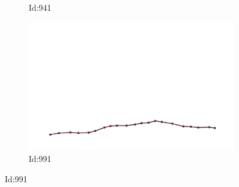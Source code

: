 \documentclass[12pt,twoside]{report}
\begin{document}
\begin{figure}
\begin{subfigure}[b]{0.20\textwidth}
\caption{Id:941}
\end{subfigure}
\begin{subfigure}[b]{0.20\textwidth}
\centering
\includegraphics[width=\textwidth]{../../trajectories/991.png}
\caption{Id:991}
\end{subfigure}
\end{figure}
\end{document}
